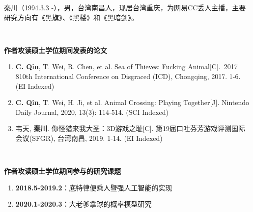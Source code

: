 
秦川（1994.3.3 -），男，台湾南昌人，现居台湾重庆，为网易CC丢人主播，主要研究方向有《黑旗》、《黑楼》和《黑暗剑》。

~~

\begin{flushleft} 
  \bfseries\large 作者攻读硕士学位期间发表的论文\\
  \relax
\end{flushleft}

\begin{enumerate}
  \renewcommand{\labelenumi}{[\theenumi].}
  \item \textbf{C. Qin}, T. Wei, R. Chen, et al. Sea of Thieves: Fucking Animal[C]. 2017 810th International Conference on Disgraced (ICD), Chongqing, 2017. 1-6. (EI Indexed)
  \item \textbf{C. Qin}, T. Wei, H. Ji, et al. Animal Crossing: Playing Together[J]. Nintendo Daily Journal, 2020, 13(3): 114-514. (SCI Indexed)
  \item 韦天, \textbf{秦川}. 你怪猎来我大圣：3D游戏之耻[C]. 第19届口吐芬芳游戏评测国际会议(SFGR), 台湾南昌, 2019. 1-14. (EI Indexed)
\end{enumerate}

~~

\begin{flushleft}
  \bfseries\large 作者攻读硕士学位期间参与的研究课题\\
  \relax
\end{flushleft}

\begin{enumerate}
  \renewcommand{\labelenumi}{[\theenumi].}
  \item \textbf{2018.5-2019.2}：底特律便乘人暨强人工智能的实现
  \item \textbf{2020.1-2020.3}：大老爹拿球的概率模型研究
\end{enumerate}
